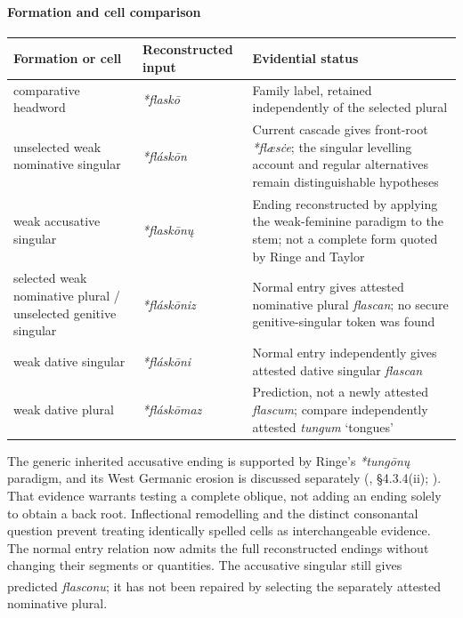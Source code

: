 \documentclass[
  british,
  a4paper,
]{article}
\newcounter{none} %
\providecommand{\Pred}[1]{\textsuperscript{\dag}\emph{#1}}
\begin{document}
\paragraph{Formation and cell
comparison}\label{formation-and-cell-comparison}

{\def\LTcaptype{none} %
\begin{longtable}[]{@{}
  >{\raggedright\arraybackslash}p{}
  >{\raggedright\arraybackslash}p{}
  >{\raggedright\arraybackslash}p{}@{}}
\toprule\noalign{}
\begin{minipage}[b]{\linewidth}\raggedright
Formation or cell
\end{minipage} & \begin{minipage}[b]{\linewidth}\raggedright
Reconstructed input
\end{minipage} & \begin{minipage}[b]{\linewidth}\raggedright
Evidential status
\end{minipage} \\
\midrule\noalign{}
\endhead
\bottomrule\noalign{}
\endlastfoot
comparative headword & \emph{*flaskō} & Family label, retained
independently of the selected plural \\
unselected weak nominative singular & \emph{*fláskōn} & Current cascade
gives front-root \emph{*flæsċe}; the singular levelling account and
regular alternatives remain distinguishable hypotheses \\
weak accusative singular & \emph{*flaskōnų} & Ending reconstructed by
applying the weak-feminine paradigm to the stem; not a complete form
quoted by Ringe and Taylor \\
selected weak nominative plural / unselected genitive singular &
\emph{*fláskōniz} & Normal entry gives attested nominative plural
\emph{flascan}; no secure genitive-singular token was found \\
weak dative singular & \emph{*fláskōni} & Normal entry independently
gives attested dative singular \emph{flascan} \\
weak dative plural & \emph{*fláskōmaz} & Prediction, not a newly
attested \emph{flascum}; compare independently attested \emph{tungum}
`tongues' \\
\end{longtable}
}

The generic inherited accusative ending is supported by Ringe's
\emph{*tungōnų} paradigm, and its West Germanic erosion is discussed
separately (, §4.3.4(ii);
). That
evidence warrants testing a complete oblique, not adding an ending
solely to obtain a back root. Inflectional remodelling and the distinct
consonantal question prevent treating identically spelled cells as
interchangeable evidence. The normal entry relation now admits the full
reconstructed endings without changing their segments or quantities. The
accusative singular still gives predicted \Pred{flasconu}; it has not
been repaired by selecting the separately attested nominative plural.
\end{document}
